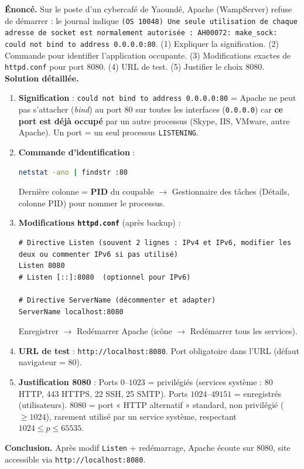 \documentclass[11pt]{article}
\begin{document}
\begin{exoresolu}
\textbf{Énoncé.} Sur le poste d'un cybercafé de Yaoundé, Apache (WampServer) refuse de démarrer : le journal indique \texttt{(OS 10048) Une seule utilisation de chaque adresse de socket est normalement autorisée : AH00072: make\_sock: could not bind to address 0.0.0.0:80}. (1) Expliquer la signification. (2) Commande pour identifier l'application occupante. (3) Modifications exactes de \texttt{httpd.conf} pour port 8080. (4) URL de test. (5) Justifier le choix 8080.
\tcblower
\textbf{Solution détaillée.}
\begin{enumerate}
\item \textbf{Signification} : \texttt{could not bind to address 0.0.0.0:80} = Apache ne peut pas s'attacher (\emph{bind}) au port 80 sur toutes les interfaces (\texttt{0.0.0.0}) car \textbf{ce port est déjà occupé} par un autre processus (Skype, IIS, VMware, autre Apache). Un port = un seul processus \texttt{LISTENING}.
\item \textbf{Commande d'identification} :
\begin{lstlisting}[language=bash]
netstat -ano | findstr :80
\end{lstlisting}
Dernière colonne = \textbf{PID} du coupable $\rightarrow$ Gestionnaire des tâches (Détails, colonne PID) pour nommer le processus.
\item \textbf{Modifications \texttt{httpd.conf}} (après backup) :
\begin{lstlisting}[language=apacheconf]
# Directive Listen (souvent 2 lignes : IPv4 et IPv6, modifier les deux ou commenter IPv6 si pas utilisé)
Listen 8080
# Listen [::]:8080  (optionnel pour IPv6)

# Directive ServerName (décommenter et adapter)
ServerName localhost:8080
\end{lstlisting}
Enregistrer $\rightarrow$ Redémarrer Apache (icône $\rightarrow$ Redémarrer tous les services).
\item \textbf{URL de test} : \texttt{http://localhost:8080}. Port obligatoire dans l'URL (défaut navigateur = 80).
\item \textbf{Justification 8080} : Ports $0\text{--}1023$ = privilégiés (services système : 80 HTTP, 443 HTTPS, 22 SSH, 25 SMTP). Ports $1024\text{--}49151$ = enregistrés (utilisateurs). 8080 = port « HTTP alternatif » standard, non privilégié ($\ge 1024$), rarement utilisé par un service système, respectant $1024 \le p \le 65535$.
\end{enumerate}
\textbf{Conclusion.} Après modif \texttt{Listen} + redémarrage, Apache écoute sur 8080, site accessible via \texttt{http://localhost:8080}.
\end{exoresolu}
\end{document}
